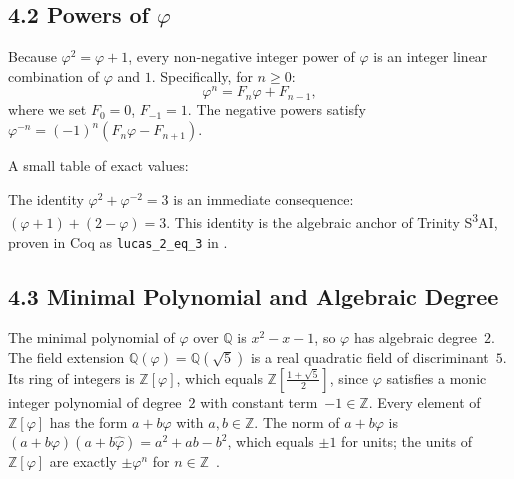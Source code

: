 \subsection{4.2 Powers of $\varphi$}
\label{subsec:gc-powers}

Because $\varphi^2 = \varphi + 1$, every non-negative
integer power of $\varphi$ is an integer linear combination
of $\varphi$ and $1$.
Specifically, for $n \geq 0$:
\[
  \varphi^n = F_n \varphi + F_{n-1},
\]
where we set $F_0 = 0$, $F_{-1} = 1$.
The negative powers satisfy $\varphi^{-n} = (-1)^n (F_n \varphi - F_{n+1})$.

A small table of exact values:
\begin{center}
\end{center}

The identity $\varphi^2 + \varphi^{-2} = 3$ is an
immediate consequence: $(\varphi + 1) + (2 - \varphi) = 3$.
This identity is the algebraic anchor of Trinity
S\textsuperscript{3}AI, proven in Coq as
\texttt{lucas\_2\_eq\_3} in
.

\subsection{4.3 Minimal Polynomial and Algebraic Degree}
\label{subsec:gc-minpoly}

The minimal polynomial of $\varphi$ over $\mathbb{Q}$
is $x^2 - x - 1$, so $\varphi$ has algebraic degree~$2$.
The field extension $\mathbb{Q}(\varphi) = \mathbb{Q}(\sqrt{5})$
is a real quadratic field of discriminant~$5$.
Its ring of integers is $\mathbb{Z}[\varphi]$, which
equals $\mathbb{Z}[\frac{1+\sqrt{5}}{2}]$, since $\varphi$
satisfies a monic integer polynomial of degree~$2$ with
constant term~$-1 \in \mathbb{Z}$.
Every element of $\mathbb{Z}[\varphi]$ has the form
$a + b\varphi$ with $a, b \in \mathbb{Z}$.
The norm of $a + b\varphi$ is
$(a+b\varphi)(a+b\hat\varphi) = a^2 + ab - b^2$,
which equals $\pm 1$ for units; the units of
$\mathbb{Z}[\varphi]$ are exactly $\pm \varphi^n$
for $n \in \mathbb{Z}$~\cite{hardy_wright}.

